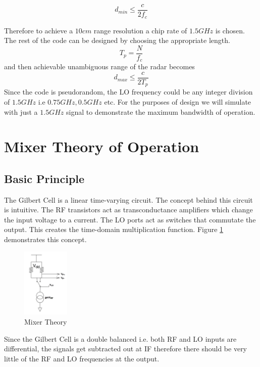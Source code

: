 \documentclass{article}                                                         %
\begin{document}
\begin{equation}
  \label{eq:rangeres}
  d_{min} \leq \dfrac{c}{2f_c}
\end{equation}

Therefore to achieve a $10cm$ range resolution a chip rate of $1.5 GHz$ is chosen. The rest of the code can be designed by
choosing the appropriate length. \\
\begin{equation}
  \label{eq:codelength}
  T_{p} = \dfrac{N}{f_c}
\end{equation}
and then achievable unambiguous range of the radar becomes
\begin{equation}
  \label{eq:maxrange}
  d_{max} \leq \dfrac{c}{2T_p}
\end{equation}
Since the code is pseudorandom, the LO frequency could be any integer division of $1.5GHz$ i.e $0.75GHz, 0.5GHz$ etc.
For the purposes of design we will simulate with just a $1.5GHz$ signal to demonstrate the maximum bandwidth of operation.
\newpage
\section{Mixer Theory of Operation}
\subsection{Basic Principle}

The Gilbert Cell is a linear time-varying circuit. The concept behind this circuit is intuitive. The RF transistors act as
transconductance amplifiers which change the input voltage to a current. The LO ports act as switches that commutate the output.
This creates the time-domain multiplication function. Figure \ref{fig:simpmix} demonstrates this concept.
\begin{figure}[H]
  \centering
  \includegraphics[width=0.2\textwidth] {Figures/gilbertSimple}
  \caption{Mixer Theory}
    \label{fig:simpmix}
\end{figure}

Since the Gilbert Cell is a double balanced i.e. both RF and LO inputs are differential, the signals get subtracted out at IF therefore
there should be very little of the RF and LO frequencies at the output.
\end{document}
